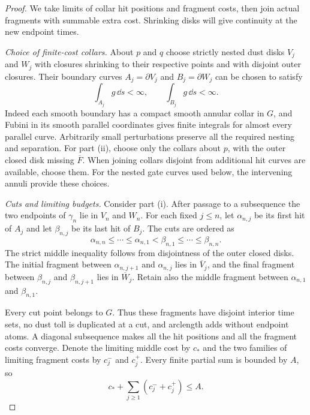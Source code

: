 \begin{proof}
We take limits of collar hit positions and fragment costs, then join
actual fragments with summable extra cost.  Shrinking disks will give
continuity at the new endpoint times.

\emph{Choice of finite-cost collars.}
About $p$ and $q$ choose strictly nested dust disks $V_j$ and $W_j$
with closures shrinking to their respective points and with disjoint
outer closures.  Their boundary curves $A_j=\partial V_j$ and
$B_j=\partial W_j$ can be chosen to satisfy
\[
 \int_{A_j}g\,\dd s<\infty,
 \qquad \int_{B_j}g\,\dd s<\infty.
\]
Indeed each smooth boundary has a compact smooth annular collar in
$G$, and Fubini in its smooth parallel coordinates gives finite
integrals for almost every parallel curve.  Arbitrarily small
perturbations preserve all the required nesting and separation.
For part \textup{(ii)}, choose only the collars about $p$, with the
outer closed disk missing $\overline F$.  When joining collars
disjoint from additional hit curves are available, choose them.
For the nested gate curves used below, the intervening annuli
provide these choices.

\emph{Cuts and limiting budgets.}
Consider part \textup{(i)}.  After passage to a subsequence the two
endpoints of $\gamma_n$ lie in $V_n$ and $W_n$.  For each fixed
$j\le n$, let $\alpha_{n,j}$ be its first hit of $A_j$ and let
$\beta_{n,j}$ be its last hit of $B_j$.  The cuts are ordered as
\[
 \alpha_{n,n}\le\cdots\le\alpha_{n,1}
       <\beta_{n,1}\le\cdots\le\beta_{n,n}.
\]
The strict middle inequality follows from disjointness of the outer
closed disks.  The initial fragment between $\alpha_{n,j+1}$ and
$\alpha_{n,j}$ lies in $\overline V_j$, and the final fragment
between $\beta_{n,j}$ and $\beta_{n,j+1}$ lies in $\overline W_j$.
Retain also the middle fragment between $\alpha_{n,1}$ and
$\beta_{n,1}$.

Every cut point belongs to $G$.  Thus these fragments have disjoint
interior time sets, no dust toll is duplicated at a cut, and arclength
adds without endpoint atoms.  A diagonal subsequence makes all the
hit positions and all the fragment costs converge.  Denote the
limiting middle cost by $c_*$ and the two families of limiting
fragment costs by $c_j^-$ and $c_j^+$.  Every finite partial sum is
bounded by $A$, so
\begin{equation}\label{eq:collar-cost-budget}
 c_*+\sum_{j\ge1}(c_j^-+c_j^+)\le A.
\end{equation}


\end{proof}
